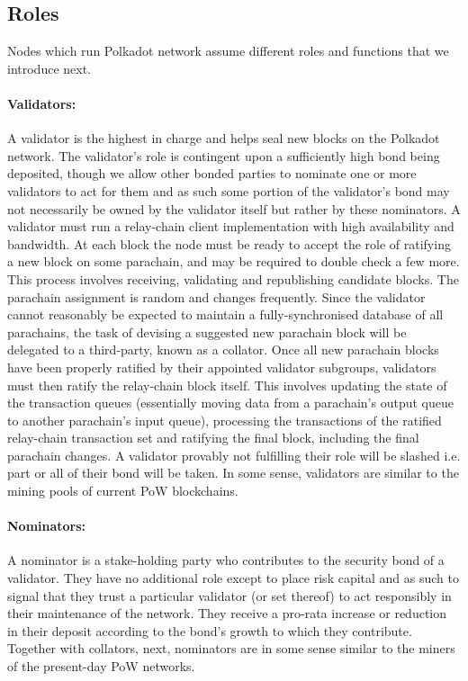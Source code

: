 \subsection{Roles}
Nodes which run Polkadot network assume different roles and functions that we introduce next.


\paragraph{Validators:}\label{par:validators} A validator is the highest in charge and helps seal new blocks on the Polkadot network. The validator’s role is contingent upon a sufficiently high bond being deposited, though we allow other bonded parties to nominate one or more validators to act for them and as such some portion of the validator’s bond may not necessarily be owned by the validator itself but rather by these nominators.
A validator must run a relay-chain client implementation with high availability and bandwidth. At each block the node must be ready to accept the role of ratifying a new block on some parachain, and may be required to double check a few more. This process involves receiving, validating and republishing candidate blocks. The parachain assignment is random and changes frequently. Since the validator cannot reasonably be expected to maintain a fully-synchronised database of all parachains, the task of devising a suggested new parachain block will be delegated to a third-party, known as a collator.
Once all new parachain blocks have been properly ratified by their appointed validator subgroups, validators must then ratify the relay-chain block itself. This involves updating the state of the transaction queues (essentially moving data from a parachain’s output queue to another parachain’s input queue), processing the transactions of the ratified relay-chain transaction set and ratifying the final block, including the final parachain changes.
A validator provably not fulfilling their role will be slashed i.e. part or all of their bond will be taken.
In some sense, validators are similar to the mining pools of current PoW blockchains.

\paragraph{Nominators:}\label{par:nominators} A nominator is a stake-holding party who contributes to the security bond of a validator. They have no additional role except to place risk capital and as such to signal that they trust a particular validator (or set thereof) to act responsibly in their maintenance of the network. They receive a pro-rata increase or reduction in their deposit according to the bond’s growth to which they contribute. Together with collators, next, nominators are in some sense similar to the miners of the present-day PoW networks.

